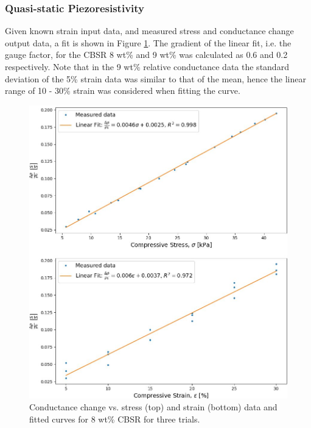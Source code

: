 \subsubsection{Quasi-static Piezoresistivity}\label{sec:Quasi-static Piezoresistivity2}
Given known strain input data, and measured stress and conductance change output data, a fit is shown in Figure \ref{fig:quasi_r_8p}. The gradient of the linear fit, i.e. the gauge factor, for the CBSR 8 wt\% and 9 wt\% was calculated as 0.6 and 0.2 respectively. Note that in the 9 wt\% relative conductance data the standard deviation of the 5\% strain data was similar to that of the mean, hence the linear range of 10 - 30\% strain was considered when fitting the curve.
\begin{figure}[H]
    \centering
    \includegraphics[width=0.8\linewidth]{Figures/CBSR_8p_cond_stress_strain_sin_titulo.jpg}
    \caption{Conductance change vs. stress (top) and strain (bottom) data and fitted curves for 8 wt\% CBSR for three trials.}
    \label{fig:quasi_r_8p}
\end{figure}

